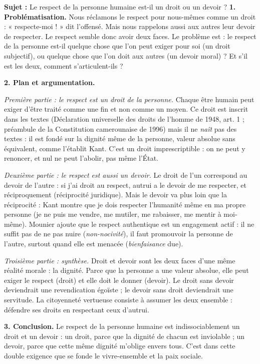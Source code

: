 \documentclass[11pt]{article}
\begin{document}
\begin{exoresolu}
\textbf{Sujet :} Le respect de la personne humaine est-il un droit ou un devoir ?
\tcblower
\textbf{1. Problématisation.} Nous réclamons le respect pour nous-mêmes comme un droit : « respecte-moi ! » dit l'offensé. Mais nous rappelons aussi aux autres leur devoir de respecter. Le respect semble donc avoir deux faces. Le problème est : le respect de la personne est-il quelque chose que l'on peut exiger pour soi (un droit subjectif), ou quelque chose que l'on doit aux autres (un devoir moral) ? Et s'il est les deux, comment s'articulent-ils ?

\textbf{2. Plan et argumentation.}

\emph{Première partie : le respect est un droit de la personne.} Chaque être humain peut exiger d'être traité comme une fin et non comme un moyen. Ce droit est inscrit dans les textes (Déclaration universelle des droits de l'homme de 1948, art. 1 ; préambule de la Constitution camerounaise de 1996) mais il ne \emph{naît} pas des textes : il est fondé sur la dignité même de la personne, valeur absolue sans équivalent, comme l'établit Kant. C'est un droit imprescriptible : on ne peut y renoncer, et nul ne peut l'abolir, pas même l'État.

\emph{Deuxième partie : le respect est aussi un devoir.} Le droit de l'un correspond au devoir de l'autre : si j'ai droit au respect, autrui a le devoir de me respecter, et réciproquement (réciprocité juridique). Mais le devoir va plus loin que la réciprocité : Kant montre que je dois respecter l'humanité même en ma propre personne (je ne puis me vendre, me mutiler, me rabaisser, me mentir à moi-même). Mounier ajoute que le respect authentique est un engagement actif : il ne suffit pas de ne pas nuire (\emph{non-nocivité}), il faut promouvoir la personne de l'autre, surtout quand elle est menacée (\emph{bienfaisance} due).

\emph{Troisième partie : synthèse.} Droit et devoir sont les deux faces d'une même réalité morale : la dignité. Parce que la personne a une valeur absolue, elle peut exiger le respect (droit) et elle doit le donner (devoir). Le droit sans devoir deviendrait une revendication égoïste ; le devoir sans droit deviendrait une servitude. La citoyenneté vertueuse consiste à assumer les deux ensemble : défendre ses droits en respectant ceux d'autrui.

\textbf{3. Conclusion.} Le respect de la personne humaine est indissociablement un droit et un devoir : un droit, parce que la dignité de chacun est inviolable ; un devoir, parce que cette même dignité m'oblige envers tous. C'est dans cette double exigence que se fonde le vivre-ensemble et la paix sociale.
\end{exoresolu}
\end{document}

